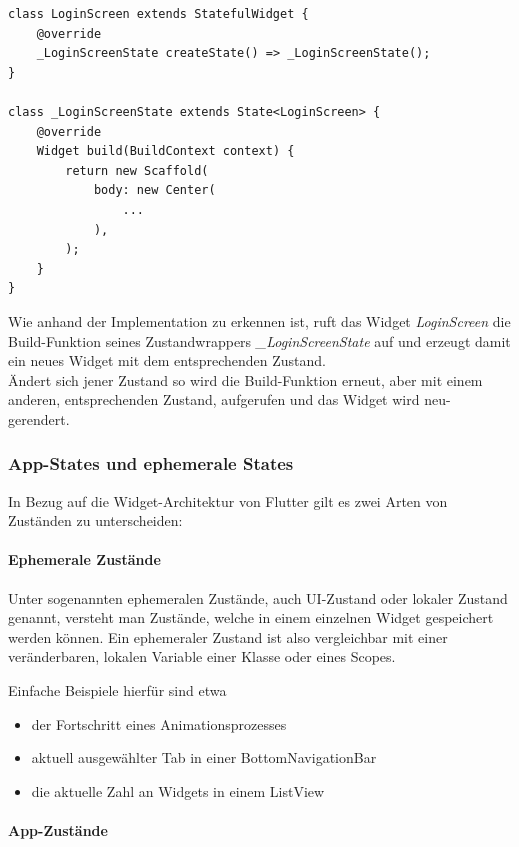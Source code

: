 \begin{lstlisting}
class LoginScreen extends StatefulWidget {
    @override
    _LoginScreenState createState() => _LoginScreenState();
}

class _LoginScreenState extends State<LoginScreen> {
    @override
    Widget build(BuildContext context) {
        return new Scaffold(
            body: new Center(
                ...
            ),
        );
    }
}
\end{lstlisting}

Wie anhand der Implementation zu erkennen ist, ruft das Widget \textit{LoginScreen} die Build-Funktion
seines Zustandwrappers \textit{\_LoginScreenState} auf und erzeugt damit ein neues Widget mit dem entsprechenden
Zustand.\\
Ändert sich jener Zustand so wird die Build-Funktion erneut, aber mit einem anderen, entsprechenden Zustand,
aufgerufen und das Widget wird neu-gerendert.

\subsubsection{App-States und ephemerale States}


In Bezug auf die Widget-Architektur von Flutter gilt es zwei Arten von Zuständen zu unterscheiden:

\paragraph{Ephemerale Zustände}

Unter sogenannten ephemeralen Zustände, auch UI-Zustand oder lokaler Zustand genannt, versteht man Zustände, welche in
einem einzelnen Widget gespeichert werden können.
Ein ephemeraler Zustand ist also vergleichbar mit einer veränderbaren, lokalen Variable einer Klasse oder eines Scopes.

Einfache Beispiele hierfür sind etwa
\begin{itemize}
    \item der Fortschritt eines Animationsprozesses
    \item aktuell ausgewählter Tab in einer BottomNavigationBar
    \item die aktuelle Zahl an Widgets in einem ListView
\end{itemize}

\paragraph{App-Zustände}

